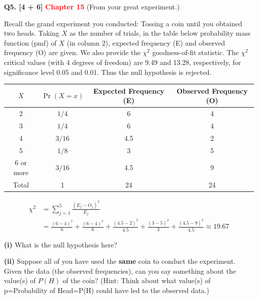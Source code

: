 \documentclass[11pt]{article}
\begin{document}
\bigskip

\textbf{Q5. [4 + 6]} \textbf{\textcolor{red}{Chapter 15}} (From your great experiment.)

Recall the grand experiment you conducted: Tossing a coin until you obtained two heads. Taking $X$ as the number of trials, in the table below probability mass function (pmf) of $X$ (in column 2), expected frequency (E) and observed frequency (O) are given. We also provide the $\chi^2$ goodness-of-fit statistic. The $\chi^2$ critical values (with 4 degrees of freedom) are 9.49 and 13.28, respectively, for significance level 0.05 and 0.01. Thus the null hypothesis is rejected.

\begin{center}
\small
\begin{tabular}{|c|c|c|c|}
\hline
$X$ & $\Pr(X=x)$ & Expected Frequency (E) & Observed Frequency (O)\\
\hline
2 & $1/4$ & 6 & 4\\ \hline
3 & $1/4$ & 6 & 4\\ \hline
4 & $3/16$ & 4.5 & 2\\ \hline
5 & $1/8$ & 3 & 5\\ \hline
6 or more & $3/16$ & 4.5 & 9\\ \hline
Total & 1 & 24 & 24\\ \hline
\end{tabular}
\end{center}

\[
\begin{aligned}
\chi^2&=\sum_{j=1}^{5}\frac{(E_j-O_j)^2}{E_j}\\
&=\frac{(6-4)^2}{6}+\frac{(6-4)^2}{6}
+\frac{(4.5-2)^2}{4.5}+\frac{(3-5)^2}{3}
+\frac{(4.5-9)^2}{4.5}\approx19.67
\end{aligned}
\]

\textbf{(i)} What is the null hypothesis here?

\textbf{(ii)} Suppose all of you have used the \textbf{same} coin to conduct the experiment. Given the data (the observed frequencies), can you say something about the value(s) of $P(H)$ of the coin? (Hint: Think about what value(s) of p=Probability of Head=P(H) could have led to the observed data.)












\clearpage
\end{document}
